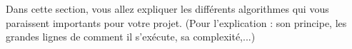 Dans cette section, vous allez expliquer les différents algorithmes qui vous paraissent importants pour votre projet. (Pour l'explication : son principe, les grandes lignes de comment il s'exécute, sa complexité,...)
